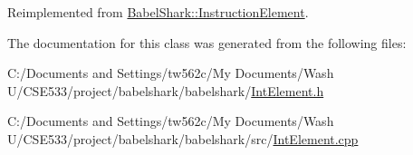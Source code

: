Reimplemented from \hyperlink{class_babel_shark_1_1_instruction_element_7795ad0b2acedb5a2b68d2c3e63351ae}{BabelShark::InstructionElement}.

The documentation for this class was generated from the following files:\begin{CompactItemize}
\item 
C:/Documents and Settings/tw562c/My Documents/Wash U/CSE533/project/babelshark/babelshark/\hyperlink{_int_element_8h}{IntElement.h}\item 
C:/Documents and Settings/tw562c/My Documents/Wash U/CSE533/project/babelshark/babelshark/src/\hyperlink{_int_element_8cpp}{IntElement.cpp}\end{CompactItemize}
